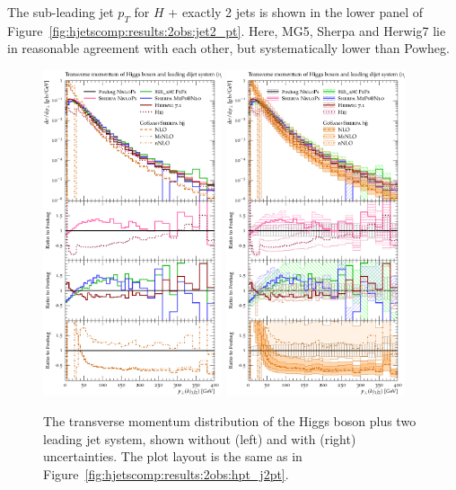 The sub-leading jet $p_T$ for $H$ + exactly 2 jets is shown in the
lower panel of Figure~\ref{fig:hjetscomp:results:2obs:jet2_pt}.
Here, MG5, Sherpa and Herwig7 lie in reasonable agreement with each
other, but systematically lower than Powheg.


\begin{figure}[t!]
  \centering
  \includegraphics[width=0.47\textwidth]{figures/hjetscomp_u_Hjj_pT_incl.pdf}
  \hfill
  \includegraphics[width=0.47\textwidth]{figures/hjetscomp_Hjj_pT_incl.pdf}
  \caption{\label{fig:hjetscomp:results:2obs:hjj_pt}%
    The transverse momentum distribution of the Higgs boson plus two
    leading jet system, shown without (left) and with (right)
    uncertainties. The plot layout is the same as in
    Figure~\ref{fig:hjetscomp:results:2obs:hpt_j2pt}.}
\end{figure}

